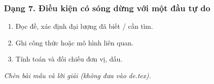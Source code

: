 \subsubsection{Dạng 7. Điều kiện có sóng dừng với một đầu tự do}
\begin{phuongphap}
\begin{enumerate}
\item Đọc đề, xác định đại lượng đã biết / cần tìm.
\item Ghi công thức hoặc mô hình liên quan.
\item Tính toán và đối chiếu đơn vị, dấu.
\end{enumerate}
\end{phuongphap}
\begin{vidumau}
\textit{Chèn bài mẫu và lời giải (không đưa vào de.tex).}
\end{vidumau}

